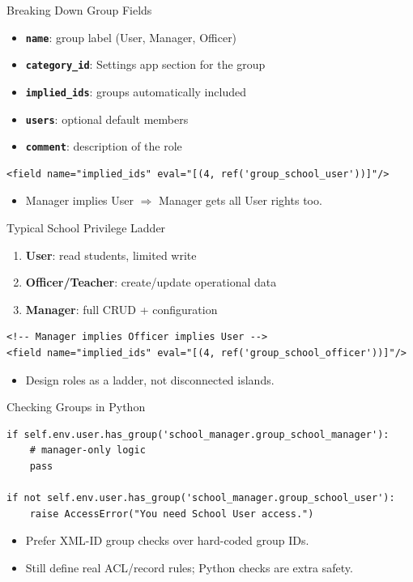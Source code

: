 \begin{frame}[fragile]{Breaking Down Group Fields}
	\begin{itemize}
		\item \textbf{\texttt{name}}: group label (User, Manager, Officer)
		\item \textbf{\texttt{category\_id}}: Settings app section for the group
		\item \textbf{\texttt{implied\_ids}}: groups automatically included
		\item \textbf{\texttt{users}}: optional default members
		\item \textbf{\texttt{comment}}: description of the role
	\end{itemize}
\begin{lstlisting}[style=xml]
<field name="implied_ids" eval="[(4, ref('group_school_user'))]"/>
\end{lstlisting}
	\begin{itemize}
		\item Manager implies User $\Rightarrow$ Manager gets all User rights too.
	\end{itemize}
\end{frame}

\begin{frame}[fragile]{Typical School Privilege Ladder}
	\begin{enumerate}
		\item \textbf{User}: read students, limited write
		\item \textbf{Officer/Teacher}: create/update operational data
		\item \textbf{Manager}: full CRUD + configuration
	\end{enumerate}
\begin{lstlisting}[style=xml]
<!-- Manager implies Officer implies User -->
<field name="implied_ids" eval="[(4, ref('group_school_officer'))]"/>
\end{lstlisting}
	\begin{itemize}
		\item Design roles as a ladder, not disconnected islands.
	\end{itemize}
\end{frame}

\begin{frame}[fragile]{Checking Groups in Python}
\begin{lstlisting}
if self.env.user.has_group('school_manager.group_school_manager'):
	# manager-only logic
	pass

if not self.env.user.has_group('school_manager.group_school_user'):
	raise AccessError("You need School User access.")
\end{lstlisting}
	\begin{itemize}
		\item Prefer XML-ID group checks over hard-coded group IDs.
		\item Still define real ACL/record rules; Python checks are extra safety.
	\end{itemize}
\end{frame}

